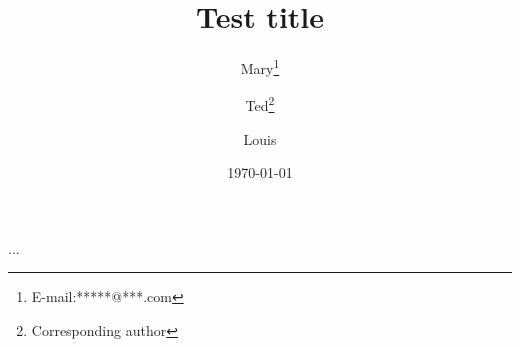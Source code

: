 \documentclass{book}
\title{Test title}
\author{ Mary\thanks{E-mail:*****@***.com}
\and Ted\thanks{Corresponding author} \and Louis}
\date{\today}
\begin{document}
\frontmatter %
\maketitle %
\tableofcontents
\mainmatter %
... \appendix %
\backmatter %
\printindex %
\end{document}
